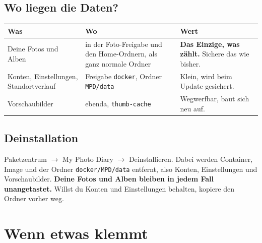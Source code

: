 \documentclass[11pt,a4paper]{article}
\let\mpdtt\texttt
\renewcommand{\texttt}[1]{\mpdtt{\textcolor{mpdred}{#1}}}
\newcommand{\kopf}[1]{\textbf{#1}}
\begin{document}
\subsection{Wo liegen die Daten?}
\begin{tabularx}{\linewidth}{|L|L|L|}
\hline
{}\kopf{Was} & \kopf{Wo} & \kopf{Wert} \\ \hline
Deine Fotos und Alben & in der Foto-Freigabe und den Home-Ordnern, als ganz
  normale Ordner & \textbf{Das Einzige, was zählt.} Sichere das wie bisher. \\ \hline
Konten, Einstellungen, Standortverlauf & Freigabe \texttt{docker}, Ordner
  \texttt{MPD/data}
  & Klein, wird beim Update gesichert. \\ \hline
Vorschaubilder & ebenda, \texttt{thumb-cache} & Wegwerfbar, baut sich neu auf. \\ \hline
\end{tabularx}

\subsection{Deinstallation}
Paketzentrum \(\rightarrow\) My Photo Diary \(\rightarrow\) Deinstallieren.
Dabei werden Container, Image und der Ordner \texttt{docker/MPD/data}
entfernt, also Konten, Einstellungen und Vorschaubilder. \textbf{Deine Fotos
und Alben bleiben in jedem Fall unangetastet.} Willst du Konten und
Einstellungen behalten, kopiere den Ordner vorher weg.

\section{Wenn etwas klemmt}
\end{document}
